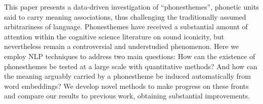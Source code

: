 This paper presents a data-driven investigation of ``phonesthemes'', phonetic units said to carry meaning associations, thus challenging the traditionally assumed arbitrariness of language. Phonesthemes have received a substantial amount of attention within the cognitive science literature on sound iconicity, but nevertheless remain a controversial and understudied phenomenon. Here we employ NLP techniques  to address two main questions: How can the existence of phonesthemes be tested at a large scale with quantitative methods? And how can the meaning arguably carried by a phonestheme be induced automatically from word embeddings? We develop novel methods to make progress on these fronts and compare our results to previous work, obtaining substantial improvements.
